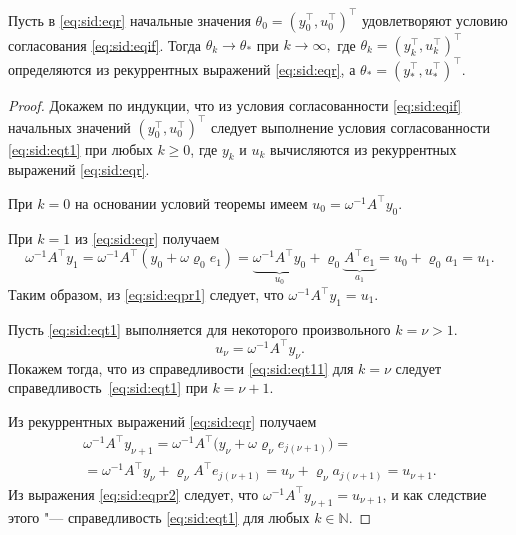 \hypertarget{sid:th1}{}

\begin{theorem}[1]Пусть в \eqref{eq:sid:eqr} начальные значения 
$\theta_0= ( y^\top _0, u^\top _0 )^\top$ удовлетворяют условию согласования \eqref{eq:sid:eqif}. 
Тогда $\theta_k\to\theta_*$ при $k\to\infty,$ где 
$\theta_k= (y^\top _k, u^\top _k)^\top$ определяются из рекуррентных выражений {\rm \eqref{eq:sid:eqr},} а 
$\theta_*= (y^\top _*, u^\top _*)^\top.$
\end{theorem}

\smallskip

\begin{proof}
Докажем по индукции, что из условия согласованности \eqref{eq:sid:eqif} начальных значений $\left(y^\top_0,u^\top_0\right)^\top$ следует выполнение условия согласованности \eqref{eq:sid:eqt1} при любых $k\geq 0$, где $y_k$ и $u_k$ вычисляются из рекуррентных выражений \eqref{eq:sid:eqr}.

При $k=0$ на основании условий теоремы  имеем $u_0=\omega^{-1}A^\top y_0$.

При $k=1$ из \eqref{eq:sid:eqr} получаем
\begin{equation}
\label{eq:sid:eqpr1}
\omega^{-1}A^\top y_1=\omega^{-1}A^\top \left(y_0+\omega\varrho_0 e_1\right)=\underbrace{\omega^{-1}A^\top y_0}_{u_0}+\varrho_0 \underbrace{ A^\top  e_1}_{a_1} = u_0+\varrho_0 a_1= u_1.
\end{equation}
Таким образом, из \eqref{eq:sid:eqpr1} следует, что $\omega^{-1}A^\top y_1 = u_1$.

Пусть \eqref{eq:sid:eqt1}  выполняется для некоторого произвольного $k =\nu > 1$. 
\begin{equation}
\label{eq:sid:eqt11}
u_\nu = \omega^{-1}A^\top y_\nu.
\end{equation}
Покажем тогда, что из справедливости \eqref{eq:sid:eqt11} для $k = \nu$ следует справедливость~\eqref{eq:sid:eqt1} при $k =\nu + 1$.

Из рекуррентных выражений \eqref{eq:sid:eqr} получаем
\begin{multline}
\label{eq:sid:eqpr2}
\omega^{-1}A^\top y_{\nu+1}=\omega^{-1}A^\top 
\bigl(y_\nu+\omega\varrho_\nu e_{j(\nu+1)}\bigr)=
\\
=
\omega^{-1}A^\top y_{\nu}+\varrho_{\nu}A^\top  e_{j\left(\nu+1\right)}= u_\nu+\varrho_{\nu}a_{j\left(\nu+1\right)}=u_{\nu+1}.
\end{multline}
Из выражения \eqref{eq:sid:eqpr2} следует, что $\omega^{-1}A^\top  y_{\nu+1}=u_{\nu+1}$, и как следствие этого "---  справедливость \eqref{eq:sid:eqt1} для любых $k \in \mathbb{N}$.


\end{proof}
